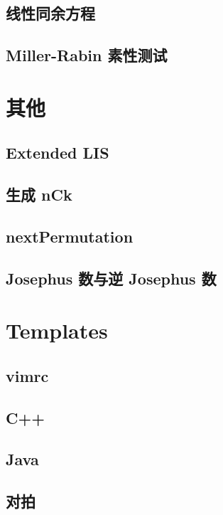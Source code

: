 \documentclass[10pt]{article}
\begin{document}
	\subsection{线性同余方程}
		

	\subsection{Miller-Rabin 素性测试}
		

\section{其他}
	\subsection{Extended LIS}
		

	\subsection{生成 nCk}
		

	\subsection{nextPermutation}
		

	\subsection{Josephus 数与逆 Josephus 数}	
		

\section{Templates}
	\subsection{vimrc}
		
	\subsection{C++}
		
	\subsection{Java}
		
	\subsection{对拍}
		
\end{document}
